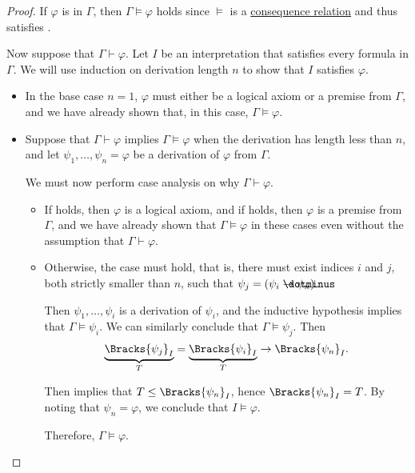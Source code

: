 \begin{proof}
   If \( \varphi \) is in \( \Gamma \), then \( \Gamma \vDash \varphi \) holds since \( \vDash \) is a \hyperref[def:consequence_relation]{consequence relation} and thus satisfies .

   Now suppose that \( \Gamma \vdash \varphi \). Let \( I \) be an interpretation that satisfies every formula in \( \Gamma \). We will use induction on derivation length \( n \) to show that \( I \) satisfies \( \varphi \).

  \begin{itemize}
    \item In the base case \( n = 1 \), \( \varphi \) must either be a logical axiom or a premise from \( \Gamma \), and we have already shown that, in this case, \( \Gamma \vDash \varphi \).

    \item Suppose that \( \Gamma \vdash \varphi \) implies \( \Gamma \vDash \varphi \) when the derivation has length less than \( n \), and let \( \psi_1, \ldots, \psi_n = \varphi \) be a derivation of \( \varphi \) from \( \Gamma \).

    We must now perform case analysis on why \( \Gamma \vdash \varphi \).
    \begin{itemize}
      \item If  holds, then \( \varphi \) is a logical axiom, and if  holds, then \( \varphi \) is a premise from \( \Gamma \), and we have already shown that \( \Gamma \vDash \varphi \) in these cases even without the assumption that \( \Gamma \vdash \varphi \).

      \item Otherwise, the case  must hold, that is, there must exist indices \( i \) and \( j \), both strictly smaller than \( n \), such that \( \psi_j = (\psi_i \synimplies \psi_n) \).

      Then \( \psi_1, \ldots, \psi_i \) is a derivation of \( \psi_i \), and the inductive hypothesis implies that \( \Gamma \vDash \psi_i \). We can similarly conclude that \( \Gamma \vDash \psi_j \). Then
      \begin{equation*}
        \underbrace{ \Bracks{ \psi_j }_I }_T = \underbrace{ \Bracks{ \psi_i }_I }_T \rightarrow \Bracks{ \psi_n }_I.
      \end{equation*}

      Then  implies that \( T \leq \Bracks{ \psi_n }_I \), hence \( \Bracks{ \psi_n }_I = T \). By noting that \( \psi_n = \varphi \), we conclude that \( I \vDash \varphi \).

      Therefore, \( \Gamma \vDash \varphi \).
    \end{itemize}
  \end{itemize}
\end{proof}
